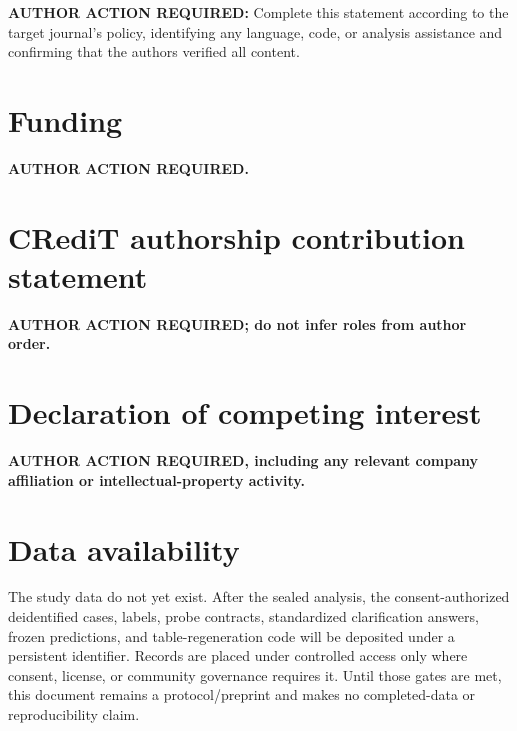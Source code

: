 \documentclass[preprint,12pt,authoryear]{elsarticle}
\begin{document}
\textcolor{lockred}{\textbf{AUTHOR ACTION REQUIRED:}} Complete this statement
according to the target journal's policy, identifying any language, code, or
analysis assistance and confirming that the authors verified all content.

\section*{Funding}

\textcolor{lockred}{\textbf{AUTHOR ACTION REQUIRED.}}

\section*{CRediT authorship contribution statement}

\textcolor{lockred}{\textbf{AUTHOR ACTION REQUIRED; do not infer roles from
author order.}}

\section*{Declaration of competing interest}

\textcolor{lockred}{\textbf{AUTHOR ACTION REQUIRED, including any relevant
company affiliation or intellectual-property activity.}}

\section*{Data availability}

The study data do not yet exist. After the sealed analysis, the
consent-authorized deidentified cases, labels, probe contracts, standardized
clarification answers, frozen predictions, and table-regeneration code will be
deposited under a persistent identifier. Records are placed under controlled
access only where consent, license, or community governance requires it. Until
those gates are met, this document remains a protocol/preprint and makes no
completed-data or reproducibility claim.



\end{document}
